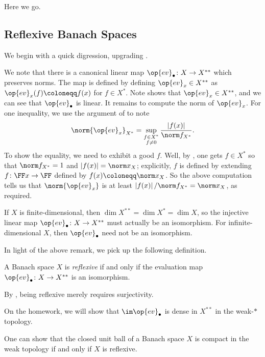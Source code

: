 \documentclass[../notes.tex]{subfiles}
\begin{document}
Here we go.

\subsection{Reflexive Banach Spaces}
We begin with a quick digression, upgrading .
\begin{remark} \label{rem:ev-preserve-norm}
	We note that there is a canonical linear map $\op{ev}_\bullet\colon X\to X^{**}$ which preserves norms. The map is defined by defining $\op{ev}_x\in X^{**}$ as $\op{ev}_x(f)\coloneqq f(x)$ for $f\in X^*$. Note  shows that ${\op{ev}_x}\in X^{**}$, and we can see that $\op{ev}_\bullet$ is linear. It remains to compute the norm of $\op{ev}_x$. For one inequality, we use the argument of  to note
	\[\norm{\op{ev}_x}_{X^{*}}=\sup_{\substack{f\in X^*\\f\ne0}}\frac{\left|f(x)\right|}{\norm f_{X^*}}.\]
	To show the equality, we need to exhibit a good $f$. Well, by , one gets $f\in X^*$ so that $\norm f_{X^*}=1$ and $\left|f(x)\right|=\norm x_X$; explicitly, $f$ is defined by extending $f\colon\FF x\to\FF$ defined by $f(x)\coloneqq\norm x_X$. So the above computation tells us that $\norm{\op{ev}_x}$ is at least $\left|f(x)\right|/\norm f_{X^*}=\norm x_X$, as required.
\end{remark}
\begin{remark}
	If $X$ is finite-dimensional, then $\dim X^{**}=\dim X^*=\dim X$, so the injective linear map $\op{ev}_\bullet\colon X\to X^{**}$ must actually be an isomorphism. For infinite-dimensional $X$, then $\op{ev}_\bullet$ need not be an isomorphism.
\end{remark}
In light of the above remark, we pick up the following definition.
\begin{definition}[reflexive]
	A Banach space $X$ is \textit{reflexive} if and only if the evaluation map $\op{ev}_\bullet\colon X\to X^{**}$ is an isomorphism.
\end{definition}
By , being reflexive merely requires surjectivity.
\begin{remark}
	On the homework, we will show that $\im\op{ev}_\bullet$ is dense in $X^{**}$ in the weak-$*$ topology.
\end{remark}
\begin{remark} \label{rem:reflexive-by-ball}
	One can show that the closed unit ball of a Banach space $X$ is compact in the weak topology if and only if $X$ is reflexive.
\end{remark}
\end{document}
